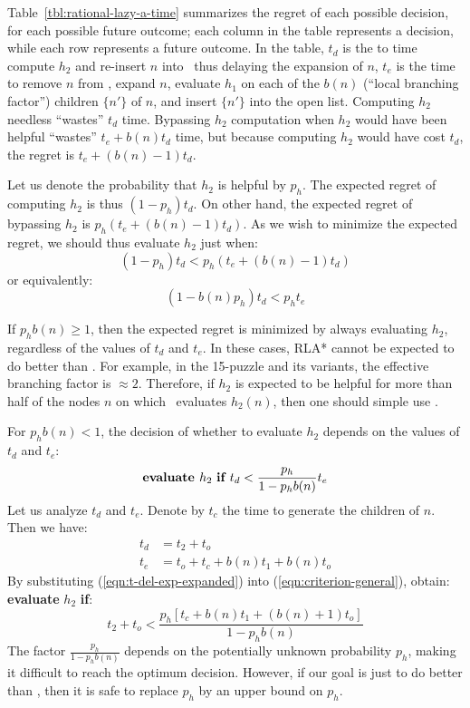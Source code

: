 Table~\ref{tbl:rational-lazy-a-time}
summarizes the regret of each possible decision, for each possible future
outcome; each column in the table represents a decision, while each row
represents a future outcome.
In the table, $t_d$ is the to time compute $h_2$ and re-insert $n$ into
\OPEN~thus delaying the expansion of $n$, $t_e$ is the time to remove $n$ from \OPEN,
expand $n$, evaluate $h_1$ on each of the $b(n)$ (``local branching factor'')
children $\{n'\}$ of $n$, and insert $\{n'\}$ into the open list.
Computing $h_2$ needless ``wastes'' $t_d$ time.
Bypassing $h_2$ computation when $h_2$ would have been helpful ``wastes''
$t_e+b(n)t_d$ time, but because computing $h_2$ would have cost $t_d$, the
regret is $t_e+(b(n)-1)t_d$.

Let us denote the probability that $h_2$ is helpful by
$p_h$.
The expected regret of computing $h_2$ is thus $(1-p_h) t_d$.
On other hand, the expected regret of bypassing $h_2$ is $p_h(
t_e+(b(n)-1)t_d)$. As we wish to minimize the expected regret, we should thus evaluate $h_2$ just when:
\begin{equation}
(1-p_h) t_d < p_h (t_e+(b(n)-1)t_d)
\end{equation}
or equivalently:
\begin{equation}
(1-b(n) p_h) t_d < p_h t_e
\end{equation}

If $p_h b(n) \ge 1$, then the expected regret is minimized by always
evaluating $h_2$, regardless of the values of $t_d$ and $t_e$.
In these cases, RLA* cannot be expected to do better than \lazyastar.
For example, in the 15-puzzle and its variants, the
effective branching factor is $\approx 2$. Therefore, if $h_2$ is expected to be helpful for more than half of the nodes $n$
on which \lazyastar~evaluates $h_2(n)$, then one should simple use \lazyastar.

For $p_h b(n) < 1$,  the decision of whether to evaluate $h_2$
depends on the values of $t_d$ and $t_e$:
\begin{equation}
\mbox{\bf evaluate }h_2\mbox{ \bf if }t_d<\frac {p_h} {1-p_hb(n)} t_e
\label{eqn:criterion-general}
\end{equation}
Let us analyze $t_d$ and $t_e$. Denote by
$t_c$ the time to generate the children of $n$. Then we have:
\begin{align}
t_d&=t_2+t_o\nonumber\\
t_e&=t_o + t_c+b (n) t_1 + b(n) t_o
\label{eqn:t-del-exp-expanded}
\end{align}
By substituting
(\ref{eqn:t-del-exp-expanded}) into (\ref{eqn:criterion-general}), obtain: {\bf evaluate} $h_2$ {\bf if}:
\begin{equation}
{t_2+t_o}<\frac {p_h \left[{t_c} + b (n)t_1+(b(n)+1){t_o}\right]} {1-p_hb(n)}
\label{eqn:criterion-expanded}
\end{equation}
The factor $\frac {p_h} {1-p_hb(n)}$ depends on the potentially unknown
probability $p_h$, making it difficult to reach the optimum decision.
However, if our goal is just to do better than \lazyastar, then it is safe to replace $p_h$ by an upper bound on $p_h$.

